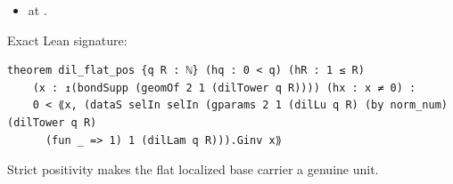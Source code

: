 \begin{theorem}[bp-091]
\begin{itemize}
\item \texttt{} at \texttt{}.
\end{itemize}
\par Exact Lean signature:
\begin{verbatim}
theorem dil_flat_pos {q R : ℕ} (hq : 0 < q) (hR : 1 ≤ R)
    (x : ↥(bondSupp (geomOf 2 1 (dilTower q R)))) (hx : x ≠ 0) :
    0 < ⟪x, (dataS selIn selIn (gparams 2 1 (dilLu q R) (by norm_num) (dilTower q R)
      (fun _ => 1) 1 (dilLam q R))).Ginv x⟫
\end{verbatim}
\end{theorem}

\begin{theorem}[bp-092]
\label{bp-092}
\uses{}
\leanok
Strict positivity makes the flat localized base carrier a genuine unit.


\end{theorem}
